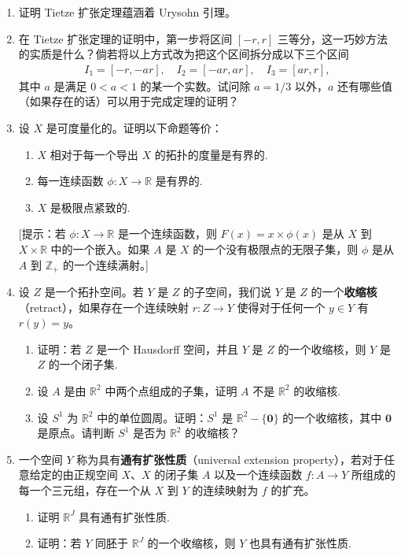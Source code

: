 \begin{enumerate}
\item 证明 Tietze 扩张定理蕴涵着 Urysohn 引理。
\item 在 Tietze 扩张定理的证明中，第一步将区间 $[-r,r]$ 三等分，这一巧妙方法的实质是什么？倘若将以上方式改为把这个区间拆分成以下三个区间
\begin{align*}
I_{1}=[-r,-ar],\quad I_{2}=[-ar,ar],\quad I_{3}=[ar,r],
\end{align*}
其中 $a$ 是满足 $0<a<1$ 的某一个实数。试问除 $a=1/3$ 以外，$a$ 还有哪些值（如果存在的话）可以用于完成定理的证明？
\item 设 $X$ 是可度量化的。证明以下命题等价：
\begin{enumerate}
\item $X$ 相对于每一个导出 $X$ 的拓扑的度量是有界的.
\item 每一连续函数 $\phi\colon X\to\mathbb{R}$ 是有界的.
\item $X$ 是极限点紧致的.
\end{enumerate}
[提示：若 $\phi\colon X\to\mathbb{R}$ 是一个连续函数，则 $F(x)=x\times\phi(x)$ 是从 $X$ 到 $X\times\mathbb{R}$ 中的一个嵌入。如果 $A$ 是 $X$ 的一个没有极限点的无限子集，则 $\phi$ 是从 $A$ 到 $\mathbb{Z}_{+}$ 的一个连续满射。]
\item 设 $Z$ 是一个拓扑空间。若 $Y$ 是 $Z$ 的子空间，我们说 $Y$ 是 $Z$ 的一个\textbf{收缩核}（retract），如果存在一个连续映射 $r\colon Z\to Y$ 使得对于任何一个 $y\in Y$ 有 $r(y)=y$。
\begin{enumerate}
\item 证明：若 $Z$ 是一个 Hausdorff 空间，并且 $Y$ 是 $Z$ 的一个收缩核，则 $Y$ 是 $Z$ 的一个闭子集.
\item 设 $A$ 是由 $\mathbb{R}^{2}$ 中两个点组成的子集，证明 $A$ 不是 $\mathbb{R}^{2}$ 的收缩核.
\item 设 $S^{1}$ 为 $\mathbb{R}^{2}$ 中的单位圆周。证明：$S^{1}$ 是 $\mathbb{R}^{2}-\{\boldsymbol{0}\}$ 的一个收缩核，其中 $\boldsymbol{0}$ 是原点。请判断 $S^{1}$ 是否为 $\mathbb{R}^{2}$ 的收缩核？
\end{enumerate}
\item 一个空间 $Y$ 称为具有\textbf{通有扩张性质}（universal extension property），若对于任意给定的由正规空间 $X$、$X$ 的闭子集 $A$ 以及一个连续函数 $f\colon A\to Y$ 所组成的每一个三元组，存在一个从 $X$ 到 $Y$ 的连续映射为 $f$ 的扩充。
\begin{enumerate}
\item 证明 $\mathbb{R}^{J}$ 具有通有扩张性质.
\item 证明：若 $Y$ 同胚于 $\mathbb{R}^{J}$ 的一个收缩核，则 $Y$ 也具有通有扩张性质.

\end{enumerate}
\end{enumerate}
